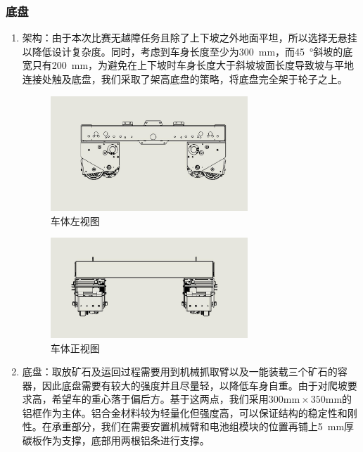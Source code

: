 \documentclass[10pt]{ctexart}
\begin{document}
\subsubsection{底盘}
\begin{enumerate}
    \item 架构：由于本次比赛无越障任务且除了上下坡之外地面平坦，所以选择无悬挂以降低设计复杂度。同时，考虑到车身长度至少为\SI{300}{\milli\meter}，而\SI{45}{\degree}斜坡的底宽只有\SI{200}{\milli\meter}，为避免在上下坡时车身长度大于斜坡坡面长度导致坡与平地连接处触及底盘，我们采取了架高底盘的策略，将底盘完全架于轮子之上。
          \begin{figure}[H]
              \centering
              \includegraphics[width = 0.7\textwidth]{machinery/car_left.jpg}
              \caption{车体左视图}
              \label{fig:car_left}
          \end{figure}
          \begin{figure}[H]
              \centering
              \includegraphics[width = 0.7\textwidth]{machinery/car_front.jpg}
              \caption{车体正视图}
              \label{fig:car_front}
          \end{figure}
    \item 底盘：取放矿石及运回过程需要用到机械抓取臂以及一能装载三个矿石的容器，因此底盘需要有较大的强度并且尽量轻，以降低车身自重。由于对爬坡要求高，希望车的重心落于偏后方。基于这两点，我们采用$300\si{\milli\meter} \times 350\si{\milli\meter}$的铝框作为主体。铝合金材料较为轻量化但强度高，可以保证结构的稳定性和刚性。在承重部分，我们在需要安置机械臂和电池组模块的位置再铺上\SI{5}{\milli\meter}厚碳板作为支撑，底部用两根铝条进行支撑。

\end{enumerate}
\end{document}
